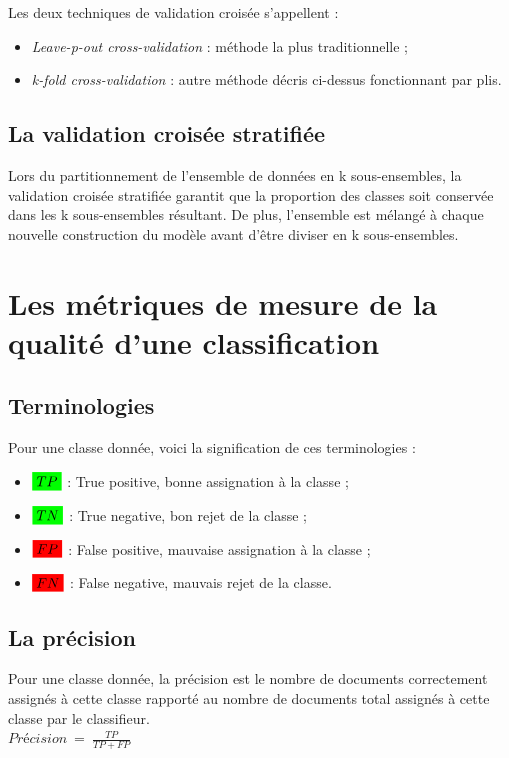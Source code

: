         Les deux techniques de validation croisée s'appellent :
        \begin{itemize}
            \item \textit{Leave-p-out cross-validation} : méthode la plus traditionnelle ;
            \item \textit{k-fold cross-validation} : autre méthode décris ci-dessus fonctionnant par plis.
        \end{itemize}

    \subsection{La validation croisée stratifiée}
    \label{annexe:cv_s}
        Lors du partitionnement de l'ensemble de données en k sous-ensembles, la validation croisée stratifiée  garantit que la proportion des classes soit conservée dans les k sous-ensembles résultant. De plus, l’ensemble est mélangé à chaque nouvelle construction du modèle avant d'être diviser en k sous-ensembles.

\section{Les métriques de mesure de la qualité d'une classification}
    \subsection{Terminologies}
        Pour une classe donnée, voici la signification de ces terminologies :
        \begin{itemize}
            \item $\highlight[green]{TP}$ : True positive, bonne assignation à la classe ;
            \item $\highlight[green]{TN}$ : True negative, bon rejet de la classe ;
            \item $\highlight[red]{FP}$ : False positive, mauvaise assignation à la classe ;
            \item $\highlight[red]{FN}$ : False negative, mauvais rejet de la classe.
        \end{itemize}

    \subsection{La précision}
    \label{annexe:precision}
        Pour une classe donnée, la précision est le nombre de documents correctement assignés à cette classe rapporté au nombre de documents total assignés à cette classe par le classifieur.\\
        $Précision\ =\ \frac{TP}{TP+FP}$


